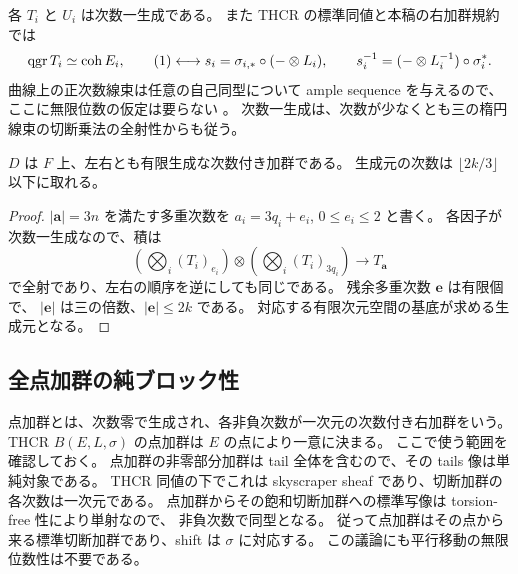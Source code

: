 各 $T_i$ と $U_i$ は次数一生成である。
また THCR の標準同値と本稿の右加群規約では
\begin{equation}\label{mbiq:eq:thcr-shift}
 \operatorname{qgr} T_i\simeq\operatorname{coh}E_i,\qquad
 (1)\longleftrightarrow s_i=\sigma_{i,*}\circ(-\otimes L_i),
 \qquad s_i^{-1}=(-\otimes L_i^{-1})\circ\sigma_i^*.
\end{equation}
曲線上の正次数線束は任意の自己同型について ample sequence を与えるので、
ここに無限位数の仮定は要らない
\cite[\S3, equations~(3.1), (3.3), Theorem~3.2]{NFMStaffordVdB}。
次数一生成は、次数が少なくとも三の楕円線束の切断乗法の全射性からも従う。

\begin{lemma}[純三次部分上の有限生成性]
\label{mbiq:lem:finite-pure}
$D$ は $F$ 上、左右とも有限生成な次数付き加群である。
生成元の次数は $\lfloor2k/3\rfloor$ 以下に取れる。
\end{lemma}
\begin{proof}
$|\boldsymbol a|=3n$ を満たす多重次数を
$a_i=3q_i+e_i$, $0\leq e_i\leq2$ と書く。
各因子が次数一生成なので、積は
\[
 \left(\bigotimes_i(T_i)_{e_i}\right)
 \otimes\left(\bigotimes_i(T_i)_{3q_i}\right)
 \longrightarrow T_{\boldsymbol a}
\]
で全射であり、左右の順序を逆にしても同じである。
残余多重次数 $\boldsymbol e$ は有限個で、
$|\boldsymbol e|$ は三の倍数、$|\boldsymbol e|\leq2k$ である。
対応する有限次元空間の基底が求める生成元となる。
\end{proof}

\subsection{全点加群の純ブロック性}

点加群とは、次数零で生成され、各非負次数が一次元の次数付き右加群をいう。
THCR $B(E,L,\sigma)$ の点加群は $E$ の点により一意に決まる。
ここで使う範囲を確認しておく。
点加群の非零部分加群は tail 全体を含むので、その tails 像は単純対象である。
THCR 同値の下でこれは skyscraper sheaf であり、切断加群の各次数は一次元である。
点加群からその飽和切断加群への標準写像は torsion-free 性により単射なので、
非負次数で同型となる。
従って点加群はその点から来る標準切断加群であり、shift は $\sigma$ に対応する。
この議論にも平行移動の無限位数性は不要である。

